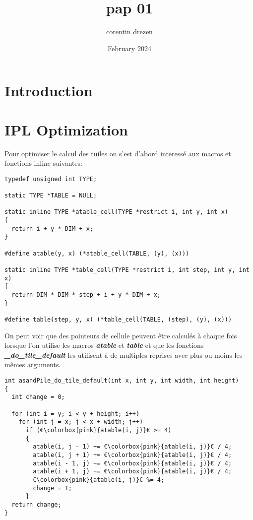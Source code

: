 \documentclass{article}
\title{pap 01}
\author{corentin drezen}
\date{February 2024}
\begin{document}
\maketitle

\section{Introduction}

\section{IPL Optimization}

Pour optimiser le calcul des tuiles on s'est d'abord interessé aux macros et fonctions inline suivantes:

\begin{verbatim}
typedef unsigned int TYPE;

static TYPE *TABLE = NULL;

static inline TYPE *atable_cell(TYPE *restrict i, int y, int x)
{
  return i + y * DIM + x;
}

#define atable(y, x) (*atable_cell(TABLE, (y), (x)))

static inline TYPE *table_cell(TYPE *restrict i, int step, int y, int x)
{
  return DIM * DIM * step + i + y * DIM + x;
}

#define table(step, y, x) (*table_cell(TABLE, (step), (y), (x)))
\end{verbatim}

On peut voir que des pointeurs de cellule peuvent être calculés à chaque fois lorsque l'on utilise les macros \textbf{\textit{atable}} et \textbf{\textit{table}} et que les fonctions \textbf{\textit{\_do\_tile\_default}} les utilisent à de multiples reprises avec plus ou moins les mêmes arguments.

\begin{verbatim}
int asandPile_do_tile_default(int x, int y, int width, int height)
{
  int change = 0;

  for (int i = y; i < y + height; i++)
    for (int j = x; j < x + width; j++)
      if (€\colorbox{pink}{atable(i, j)}€ >= 4)
      {
        atable(i, j - 1) += €\colorbox{pink}{atable(i, j)}€ / 4;
        atable(i, j + 1) += €\colorbox{pink}{atable(i, j)}€ / 4;
        atable(i - 1, j) += €\colorbox{pink}{atable(i, j)}€ / 4;
        atable(i + 1, j) += €\colorbox{pink}{atable(i, j)}€ / 4;
        €\colorbox{pink}{atable(i, j)}€ %= 4;
        change = 1;
      }
  return change;
}
\end{verbatim}
\end{document}
